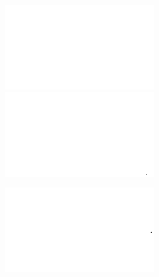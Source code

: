 \begin{figure}[H]
\begin{minipage}[t]{0.22\textwidth}
    \label{fig:hom_20}
\end{minipage}
\begin{minipage}[t]{0.22\textwidth}
    \includegraphics[width = \textwidth]{result/hom/im_m10.png}
    \label{fig:hom_10}
    \includegraphics[width = \textwidth]{result/hom/im_m25.png}
    \label{fig:hom_25}
\end{minipage}
\begin{minipage}[t]{0.22\textwidth}
    \includegraphics[width = \textwidth]{result/hom/im_m15.png}

\end{minipage}
\end{figure}
